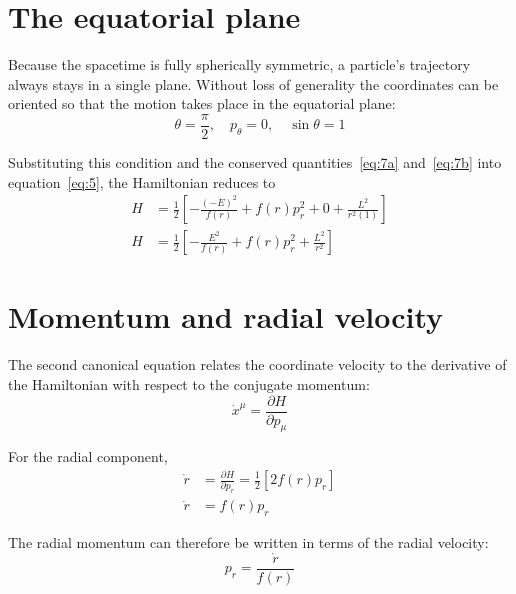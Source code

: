 \documentclass[11pt,a4paper]{article}
\begin{document}
\section{The equatorial plane}
\label{sec:equatorial}

Because the spacetime is fully spherically symmetric, a particle's trajectory always stays in a single plane. Without loss of generality the coordinates can be oriented so that the motion takes place in the equatorial plane:
\begin{equation*}
\theta = \frac{\pi}{2}, \quad p_\theta = 0, \quad \sin\theta = 1
\end{equation*}

Substituting this condition and the conserved quantities~\eqref{eq:7a} and~\eqref{eq:7b} into equation~\eqref{eq:5}, the Hamiltonian reduces to
\begin{align*}
    H &= \frac{1}{2} \left[ -\frac{(-E)^2}{f(r)} + f(r) p_r^2 + 0 + \frac{L^2}{r^2(1)} \right] \\
    H &= \frac{1}{2} \left[ -\frac{E^2}{f(r)} + f(r) p_r^2 + \frac{L^2}{r^2} \right] \tag{8}\label{eq:8}
\end{align*}

\section{Momentum and radial velocity}

The second canonical equation relates the coordinate velocity to the derivative of the Hamiltonian with respect to the conjugate momentum:
\begin{equation*}
\dot{x}^\mu = \frac{\partial H}{\partial p_\mu} \tag{9}\label{eq:9}
\end{equation*}

For the radial component,
\begin{align*}
    \dot{r} &= \frac{\partial H}{\partial p_r} = \frac{1}{2} \left[ 2 f(r) p_r \right] \\
    \dot{r} &= f(r) p_r \tag{10}\label{eq:10}
\end{align*}

The radial momentum can therefore be written in terms of the radial velocity:
\begin{equation*}
p_r = \frac{\dot{r}}{f(r)} \tag{11}\label{eq:11}
\end{equation*}
\end{document}
